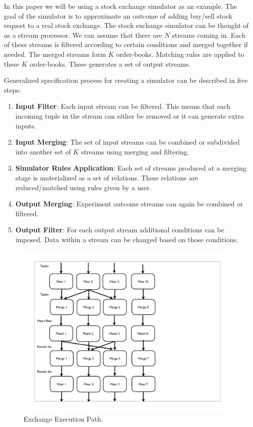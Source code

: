 \documentclass{article}
\begin{document}
In this paper we will be using a stock exchange simulator as an example. The goal of the simulator is to approximate an outcome of adding buy/sell stock request to a real stock exchange. The stock exchange simulator can be thought of as a stream processor. We can assume that there are $N$ streams coming in. Each of these streams is filtered according to certain conditions and merged together if needed. The merged streams form $K$ order-books. Matching rules are applied to these $K$ order-books. These generates a set of output streams.

Generalized specification process for creating a simulator can be described in five steps:

\begin{enumerate}
    \item {\bf Input Filter}: Each input stream can be filtered. This means that each incoming tuple in the stream can either be removed or it can generate extra inputs. 
    \item {\bf Input Merging}: The set of input streams can be combined or subdivided into another set of $K$ streams using merging and filtering. 
    \item {\bf Simulator Rules Application}: Each set of streams produced at a merging stage is materialized as a set of relations. These relations are reduced/matched using rules given by a user.
    \item {\bf Output Merging}: Experiment outcome streams can again be combined or filtered.
    \item {\bf Output Filter}: For each output stream additional conditions can be imposed. Data within a stream can be changed based on those conditions.
\end{enumerate}

\begin{figure}
  \includegraphics[width=4.50in]{figures/ExchangeFigure.pdf}
  \caption{Exchange Execution Path.}
  \label{fig:overview}
\end{figure}
\end{document}

